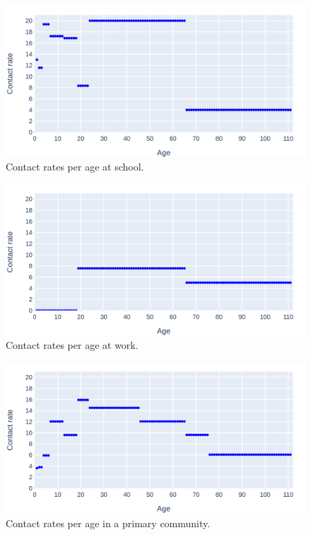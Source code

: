 \begin{figure}
    \centering
    \includegraphics[width=.8\textwidth]{3 - Stride/fig/school_contact_rates.png}
    \caption{Contact rates per age at school.}
    \label{fig:school_contact_rates}
\end{figure}

\begin{figure}
    \centering
    \includegraphics[width=.8\textwidth]{3 - Stride/fig/work_contact_rates.png}
    \caption{Contact rates per age at work.}
    \label{fig:work_contact_rates}
\end{figure}

\begin{figure}
    \centering
    \includegraphics[width=.8\textwidth]{3 - Stride/fig/primary_contact_rates.png}
    \caption{Contact rates per age in a primary community.}
    \label{fig:primary_contact_rates}
\end{figure}


